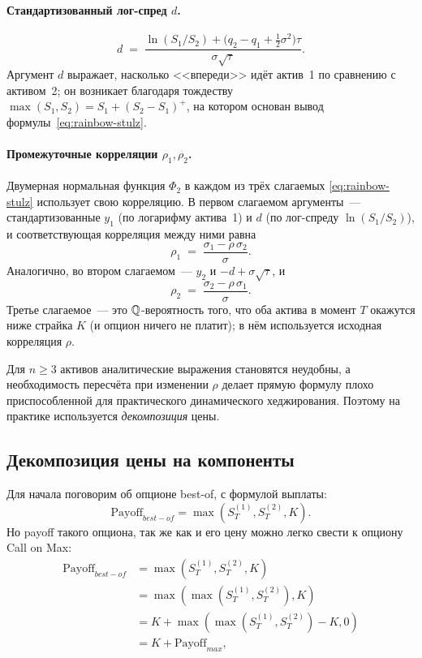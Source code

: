 \paragraph{Стандартизованный лог-спред $d$.}
\begin{equation}
\label{eq:rainbow-d}
  d \;=\; \frac{\ln(S_1/S_2) + \bigl(q_2 - q_1 + \tfrac{1}{2}\sigma^{2}\bigr)\tau}
              {\sigma\sqrt{\tau}}.
\end{equation}
Аргумент $d$ выражает, насколько <<впереди>> идёт актив~1 по сравнению
с активом~2; он возникает благодаря тождеству
$\max(S_1,S_2) = S_1 + (S_2-S_1)^{+}$, на котором основан вывод
формулы~\eqref{eq:rainbow-stulz}.

\paragraph{Промежуточные корреляции $\rho_1, \rho_2$.}
Двумерная нормальная функция $\Phi_2$ в каждом из трёх слагаемых
\eqref{eq:rainbow-stulz} использует свою корреляцию. В первом
слагаемом аргументы~--- стандартизованные $y_1$ (по логарифму
актива~1) и $d$ (по лог-спреду $\ln(S_1/S_2)$), и соответствующая
корреляция между ними равна
\begin{equation}
\label{eq:rainbow-rho1}
  \rho_1 \;=\; \frac{\sigma_1 - \rho\,\sigma_2}{\sigma}.
\end{equation}
Аналогично, во втором слагаемом~--- $y_2$ и $-d+\sigma\sqrt{\tau}$, и
\begin{equation}
\label{eq:rainbow-rho2}
  \rho_2 \;=\; \frac{\sigma_2 - \rho\,\sigma_1}{\sigma}.
\end{equation}
Третье слагаемое~--- это $\mathbb{Q}$-вероятность того, что оба актива в момент
$T$ окажутся ниже страйка $K$ (и опцион ничего не платит); в нём
используется исходная корреляция $\rho$.

Для $n\ge 3$ активов аналитические выражения
становятся неудобны, а необходимость пересчёта при изменении $\rho$
делает прямую формулу плохо приспособленной для практического
динамического хеджирования. Поэтому на практике используется
\emph{декомпозиция} цены.

\subsection{Декомпозиция цены на компоненты}
\label{sec:rainbow-decomp}

Для начала поговорим об опционе best-of, с формулой выплаты:
\[
  \text{Payoff}_{best-of} = \max(S^{(1)}_T, S^{(2)}_T, K). 
\]
Но payoff такого опциона, так же как и его цену можно легко свести к опциону Call on Max:
\begin{equation}
\label{eq:best-of_to_call_to_max}
\begin{aligned}
\text{Payoff}_{best-of}
&= \max(S^{(1)}_T, S^{(2)}_T, K) \\
&= \max(\max(S^{(1)}_T, S^{(2)}_T), K) \\
&= K + \max(\max(S^{(1)}_T, S^{(2)}_T) - K, 0) \\
&= K + \text{Payoff}_{max},
\end{aligned}
\end{equation}


